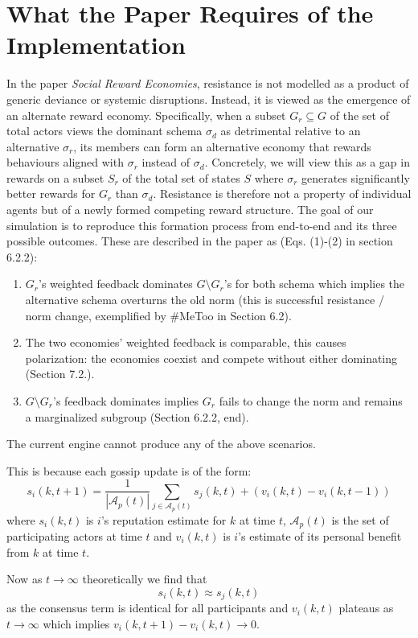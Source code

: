 \documentclass[12pt]{article}
\begin{document}
\section{What the Paper Requires of the Implementation}
In the paper \textit{Social Reward Economies}, resistance is not modelled as a product
of generic deviance or systemic disruptions. Instead, it is viewed as the emergence of an alternate reward economy.
Specifically, when a subset $G_r \subseteq G$ of the set of total actors views the dominant schema $\sigma_d$ as detrimental relative to an alternative $\sigma_r$,
its members can form an alternative economy that rewards behaviours aligned with $\sigma_r$ instead of $\sigma_d$.
Concretely, we will view this as a gap in rewards on a subset $S_r$ of the total set of states $S$ where $\sigma_r$ generates significantly better rewards
for $G_r$ than $\sigma_d$. Resistance
is therefore not a property of individual agents but of a newly formed competing reward structure.
The goal of our simulation is to reproduce this formation process from end-to-end and its three possible outcomes.
These are described in the paper as (Eqs. (1)-(2) in section 6.2.2):
\begin{enumerate}
    \item[1.] $G_r$'s weighted feedback dominates $G \setminus G_r$'s for both schema which implies the alternative schema overturns
    the old norm (this is successful resistance / norm change, exemplified by \#MeToo in Section 6.2).
    \item[2.] The two economies' weighted feedback is comparable, this causes polarization: the economies coexist and
    compete without either dominating (Section 7.2.).
    \item[3.] $G \setminus G_r$'s feedback dominates implies $G_r$ fails to change the norm and remains a marginalized subgroup
    (Section 6.2.2, end).
\end{enumerate}
The current engine cannot produce any of the above scenarios.

This is because each gossip update is of the form:
\[ s_i(k, t+1) = \frac{1}{|\mathcal A_p(t)|}\sum_{j \in \mathcal A_p(t)}s_j(k, t) + (v_i(k, t) - v_i(k, t - 1)) \]
where $s_i(k, t)$ is $i$'s reputation estimate for $k$ at time $t$, $\mathcal A_p(t)$ is the set of participating actors
at time $t$ and $v_i(k, t)$ is $i$'s estimate of its personal benefit from $k$ at time $t$.

Now as $t \to \infty$ theoretically we find that
\[ s_i(k, t) \approx s_j(k, t) \]
as the consensus term is identical for all participants and $v_i(k, t)$ plateaus as $t \to \infty$
which implies $v_i(k, t + 1) - v_i(k, t) \to 0$.
\end{document}
